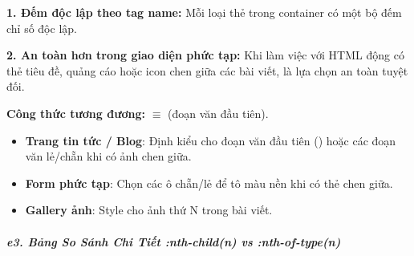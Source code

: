 \begin{warnBox}
\textbf{1. Đếm độc lập theo tag name:} Mỗi loại thẻ trong container có một bộ đếm chỉ số độc lập.
\par\vspace{4pt}
\textbf{2. An toàn hơn trong giao diện phức tạp:} Khi làm việc với HTML động có thẻ tiêu đề, quảng cáo hoặc icon chen giữa các bài viết,  là lựa chọn an toàn tuyệt đối.
\end{warnBox}

\begin{tipBox}
\textbf{Công thức tương đương:}  $\equiv$  (đoạn văn đầu tiên).
\end{tipBox}

\begin{conceptBox}
\begin{itemize}[leftmargin=1.5em, itemsep=3pt, parsep=0pt]
    \item \textbf{Trang tin tức / Blog}: Định kiểu cho đoạn văn đầu tiên () hoặc các đoạn văn lẻ/chẵn khi có ảnh chen giữa.
    \item \textbf{Form phức tạp}: Chọn các ô  chẵn/lẻ để tô màu nền khi có thẻ  chen giữa.
    \item \textbf{Gallery ảnh}: Style cho ảnh  thứ N trong bài viết.
\end{itemize}
\end{conceptBox}


\subparagraph{e3. Bảng So Sánh Chi Tiết :nth-child(n) vs :nth-of-type(n)}
\mbox{}\par\vspace{2pt}

